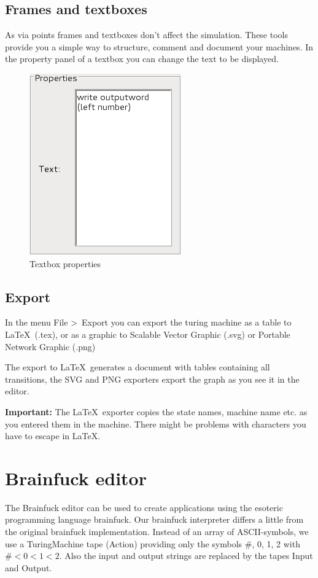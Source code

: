 \documentclass[%
  a4paper,%
  11pt,%
  blue,%
  hyperref	%
  ]{tubsartcl}
\begin{document}
\subsection{Frames and textboxes}
\label{sec:frames-textboxes}
As via points frames and textboxes don't affect the simulation. These tools provide you a simple way to structure, comment and document your machines. In the property panel of a textbox you can change the text to be displayed.
\begin{figure}[!htb]
\begin{center}
\includegraphics[scale=0.5]{graphics_gui/text_properties.png}
\end{center}
\caption{Textbox properties}
\label{pic:text_properties}
\end{figure}

\subsection{Export}
\label{sec:export}
In the menu File \textgreater \ Export you can export the turing machine as a table to \LaTeX\ (.tex), or as a graphic to Scalable Vector Graphic (.svg) or Portable Network Graphic (.png)

The export to \LaTeX\ generates a document with tables containing all transitions, the SVG and PNG exporters export the graph as you see it in the editor.

\textbf{Important:} The \LaTeX\ exporter copies the state names, machine name etc. as you entered them in the machine. There might be problems with characters you have to escape in \LaTeX. 

\clearpage

\section{Brainfuck editor}
\label{sec:brainfuck-editor}
The Brainfuck editor  can be used to create applications using the esoteric programming language brainfuck. Our brainfuck interpreter differs a little from the original brainfuck implementation. Instead of an array of ASCII-symbols, we use a TuringMachine tape (Action) providing only the symbols \#, 0, 1, 2 with $\# < 0 < 1 < 2$. Also the input and output strings are replaced by the tapes Input and Output.\\
\end{document}
